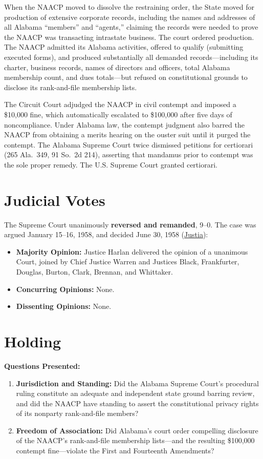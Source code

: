 \documentclass[12pt]{article}
\begin{document}
When the NAACP moved to dissolve the restraining order, the State moved for production of extensive corporate records, including the names and addresses of all Alabama ``members'' and ``agents,'' claiming the records were needed to prove the NAACP was transacting intrastate business. The court ordered production. The NAACP admitted its Alabama activities, offered to qualify (submitting executed forms), and produced substantially all demanded records---including its charter, business records, names of directors and officers, total Alabama membership count, and dues totals---but refused on constitutional grounds to disclose its rank-and-file membership lists.

The Circuit Court adjudged the NAACP in civil contempt and imposed a \$10,000 fine, which automatically escalated to \$100,000 after five days of noncompliance. Under Alabama law, the contempt judgment also barred the NAACP from obtaining a merits hearing on the ouster suit until it purged the contempt. The Alabama Supreme Court twice dismissed petitions for certiorari (265 Ala.\ 349, 91 So.\ 2d 214), asserting that mandamus prior to contempt was the sole proper remedy. The U.S. Supreme Court granted certiorari.

\section{Judicial Votes}
The Supreme Court unanimously \textbf{reversed and remanded}, 9--0. The case was argued January 15--16, 1958, and decided June 30, 1958 (\href{https://supreme.justia.com/cases/federal/us/357/449/}{Justia}):

\begin{itemize}
    \item \textbf{Majority Opinion:} Justice Harlan delivered the opinion of a unanimous Court, joined by Chief Justice Warren and Justices Black, Frankfurter, Douglas, Burton, Clark, Brennan, and Whittaker.
    \item \textbf{Concurring Opinions:} None.
    \item \textbf{Dissenting Opinions:} None.
\end{itemize}

\section{Holding}
\textbf{Questions Presented:}

\begin{enumerate}
  \item \textbf{Jurisdiction and Standing:} Did the Alabama Supreme Court's procedural ruling constitute an adequate and independent state ground barring review, and did the NAACP have standing to assert the constitutional privacy rights of its nonparty rank-and-file members?
  \item \textbf{Freedom of Association:} Did Alabama's court order compelling disclosure of the NAACP's rank-and-file membership lists---and the resulting \$100,000 contempt fine---violate the First and Fourteenth Amendments?
\end{enumerate}
\end{document}
